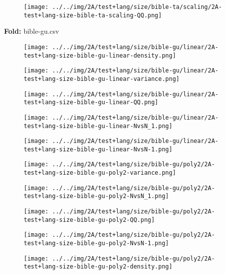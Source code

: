 \begin{figure}[H]
\centering	\texttt{[image: ../../img/2A/test+lang/size/bible-ta/scaling/2A-test+lang-size-bible-ta-scaling-QQ.png]}
\end{figure}
\textbf{Fold:} bible-gu.csv
\begin{figure}[H]
\centering	\texttt{[image: ../../img/2A/test+lang/size/bible-gu/linear/2A-test+lang-size-bible-gu-linear-density.png]}
\end{figure}
\begin{figure}[H]
\centering	\texttt{[image: ../../img/2A/test+lang/size/bible-gu/linear/2A-test+lang-size-bible-gu-linear-variance.png]}
\end{figure}
\begin{figure}[H]
\centering	\texttt{[image: ../../img/2A/test+lang/size/bible-gu/linear/2A-test+lang-size-bible-gu-linear-QQ.png]}
\end{figure}
\begin{figure}[H]
\centering	\texttt{[image: ../../img/2A/test+lang/size/bible-gu/linear/2A-test+lang-size-bible-gu-linear-NvsN\_1.png]}
\end{figure}
\begin{figure}[H]
\centering	\texttt{[image: ../../img/2A/test+lang/size/bible-gu/linear/2A-test+lang-size-bible-gu-linear-NvsN-1.png]}
\end{figure}
\begin{figure}[H]
\centering	\texttt{[image: ../../img/2A/test+lang/size/bible-gu/poly2/2A-test+lang-size-bible-gu-poly2-variance.png]}
\end{figure}
\begin{figure}[H]
\centering	\texttt{[image: ../../img/2A/test+lang/size/bible-gu/poly2/2A-test+lang-size-bible-gu-poly2-NvsN\_1.png]}
\end{figure}
\begin{figure}[H]
\centering	\texttt{[image: ../../img/2A/test+lang/size/bible-gu/poly2/2A-test+lang-size-bible-gu-poly2-QQ.png]}
\end{figure}
\begin{figure}[H]
\centering	\texttt{[image: ../../img/2A/test+lang/size/bible-gu/poly2/2A-test+lang-size-bible-gu-poly2-NvsN-1.png]}
\end{figure}
\begin{figure}[H]
\centering	\texttt{[image: ../../img/2A/test+lang/size/bible-gu/poly2/2A-test+lang-size-bible-gu-poly2-density.png]}
\end{figure}
